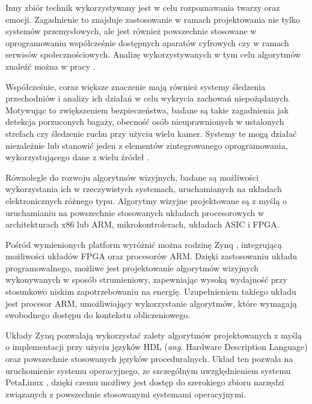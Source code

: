 Inny zbiór technik wykorzystywany jest w celu rozpoznawania twarzy oraz emocji. %
Zagadnienie to znajduje zastosowanie w ramach projektowania nie tylko systemów przemysłowych, ale jest również powszechnie stosowane w oprogramowaniu współcześnie dostępnych aparatów cyfrowych czy w ramach serwisów społecznościowych. 
Analizę wykorzystywanych w tym celu algorytmów znaleźć można w pracy \cite{Anil2016}.

Współcześnie, coraz większe znaczenie mają również systemy śledzenia przechodniów i analizy ich działań w celu wykrycia zachowań niepożądanych. %
Motywując to zwiększeniem bezpieczeństwa, badane są takie zagadnienia jak detekcja porzuconych bagaży, obecność osób nieuprawnionych w ustalonych strefach czy śledzenie ruchu przy użyciu wielu kamer. %
Systemy te mogą działać niezależnie lub stanowić jeden z elementów zintegrowanego oprogramowania, wykorzystującego dane z wielu źródeł \cite{Sriram2016,Hussain2016,Gouo2015}.

Równolegle do rozwoju algorytmów wizyjnych, badane są możliwości wykorzystania ich w rzeczywistych systemach, uruchamianych na układach elektronicznych różnego typu. %
Algorytmy wizyjne projektowane są z myślą o uruchamianiu na powszechnie stosowanych układach procesorowych w architekturach x86 lub ARM, mikrokontrolerach, układach ASIC i FPGA. %

Pośród wymienionych platform wyróżnić można rodzinę Zynq \cite{zybo-reference-manual}, integrującą możliwości układów FPGA oraz procesorów ARM. 
Dzięki zastosowaniu układu programowalnego, możliwe jest projektowanie algorytmów wizyjnych wykonywanych w sposób strumieniowy, zapewniając wysoką wydajność przy stosunkowo niskim zapotrzebowaniu na energię. %
Uzupełnieniem takiego układu jest procesor ARM, umożliwiający wykorzystanie algorytmów, które wymagają swobodnego dostępu do kontekstu obliczeniowego. %

Układy Zynq pozwalają wykorzystać zalety algorytmów projektowanych z myślą o implementacji przy użyciu języków HDL (\emph{ang.} Hardware Description Language) oraz powszechnie stosowanych języków proceduralnych. 
Układ ten pozwala na uruchomienie systemu operacyjnego, ze szczególnym uwzględnieniem systemu PetaLinux \cite{petalinux-tools}, dzięki czemu możliwy jest dostęp do szerokiego zbioru narzędzi związanych z powszechnie stosowanymi systemami operacyjnymi.


